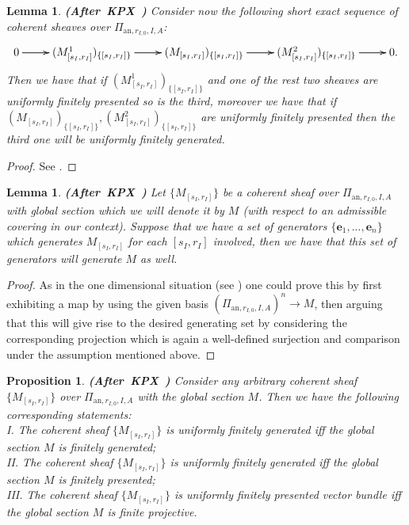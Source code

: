 \documentclass[12pt]{amsart}
\newtheorem{lemma}[theorem]{Lemma}
\newtheorem{proposition}[theorem]{Proposition}
\theoremstyle{definition}
\numberwithin{equation}{section}
\begin{document}
\begin{lemma} \mbox{\bf{(After KPX \cite[Lemma 2.1.10]{KPX})}} \label{lemma2.15}
Consider now the following short exact sequence of coherent sheaves over $\Pi_{\mathrm{an},r_{I,0},I,A}$:
\[
\xymatrix@R+2pc@C+0pc{
0\ar[r] \ar[r] &(M^1_{[s_I,r_I]})_{\{[s_I,r_I]\}} \ar[r] \ar[r] &(M_{[s_I,r_I]})_{\{[s_I,r_I]\}} \ar[r] \ar[r] &(M^2_{[s_I,r_I]})_{\{[s_I,r_I]\}} \ar[r] \ar[r] &0.} 
\]
Then we have that if $(M^1_{[s_I,r_I]})_{\{[s_I,r_I]\}}$ and one of the rest two sheaves are uniformly finitely presented so is the third, moreover we have that if $(M_{[s_I,r_I]})_{\{[s_I,r_I]\}},(M^2_{[s_I,r_I]})_{\{[s_I,r_I]\}}$ are uniformly finitely presented then the third one will be uniformly finitely generated.
\end{lemma}

\begin{proof}
See \cite[Lemma 2.1.10]{KPX}. 	
\end{proof}



	




\begin{lemma}  \mbox{\bf{(After KPX \cite[Lemma 2.1.11]{KPX})}}
Let $\{M_{[s_I,r_I]}\}$	be a coherent sheaf over $\Pi_{\mathrm{an},r_{I,0},I,A}$ with global section which we will denote it by $M$ (with respect to an admissible covering in our context). Suppose that we have a set of generators $\{\mathbf{e}_1,...,\mathbf{e}_n\}$ which generates $M_{[s_I,r_I]}$ for each $[s_I,r_I]$ involved, then we have that this set of generators will generate $M$ as well.

\end{lemma}

\begin{proof}
As in the one dimensional situation (see \cite[Lemma 2.1.11]{KPX}) one could prove this by first exhibiting a map by using the given basis $(\Pi_{\mathrm{an},r_{I,0},I,A})^n\rightarrow M$, then arguing that this will give rise to the desired generating set by considering the corresponding projection which is again a well-defined surjection and comparison under the assumption mentioned above.
\end{proof}




\begin{proposition} \mbox{\bf{(After KPX \cite[Proposition 2.1.13]{KPX})}} \label{prop1}
Consider any arbitrary coherent sheaf $\{M_{[s_I,r_I]}\}$ over $\Pi_{\mathrm{an},r_{I,0},I,A}$ with the global section $M$. Then we have the following corresponding statements:\\
I.	The coherent sheaf $\{M_{[s_I,r_I]}\}$ is uniformly finitely generated iff the global section $M$ is finitely generated;\\
II. The coherent sheaf $\{M_{[s_I,r_I]}\}$ is uniformly finitely generated iff the global section $M$ is finitely presented;\\
III. The coherent sheaf $\{M_{[s_I,r_I]}\}$ is uniformly finitely presented vector bundle iff the global section $M$ is finite projective.
\end{proposition}
\end{document}
